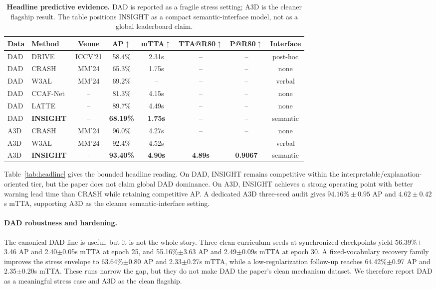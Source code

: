 \documentclass[11pt]{article}
\newcommand{\method}{\textsc{INSIGHT}}
\begin{document}
\begin{table}[t]
\centering\small
\setlength{\tabcolsep}{4pt}
\caption{\textbf{Headline predictive evidence.} DAD is reported as a fragile
stress setting; A3D is the cleaner flagship result. The table positions
\method{} as a compact semantic-interface model, not as a global leaderboard
claim.}
\label{tab:headline}
\label{tab:dad}
\label{tab:a3d}
\begin{tabular}{llcccccc}
\toprule
Data & Method & Venue & AP$\uparrow$ & mTTA$\uparrow$ & TTA@R80$\uparrow$ & P@R80$\uparrow$ & Interface \\
\midrule
DAD & DRIVE~\citep{ref2} & ICCV'21 & 58.4\% & 2.31s & -- & -- & post-hoc \\
DAD & CRASH~\citep{liao2024crash} & MM'24 & 65.3\% & 1.75s & -- & -- & none \\
DAD & W3AL~\citep{liao2024and} & MM'24 & 69.2\% & -- & -- & -- & verbal \\
DAD & CCAF-Net~\citep{liu2025ccaf} & -- & 81.3\% & 4.15s & -- & -- & none \\
DAD & LATTE~\citep{ZHANG2025103173} & -- & 89.7\% & 4.49s & -- & -- & none \\
DAD & \textbf{\method{}} & -- & \textbf{68.19\%} & \textbf{1.75s} & -- & -- & semantic \\
\midrule
A3D & CRASH~\citep{liao2024crash} & MM'24 & 96.0\% & 4.27s & -- & -- & none \\
A3D & W3AL~\citep{liao2024and} & MM'24 & 92.4\% & 4.52s & -- & -- & verbal \\
A3D & \textbf{\method{}} & -- & \textbf{93.40\%} & \textbf{4.90s} & \textbf{4.89s} & \textbf{0.9067} & semantic \\
\bottomrule
\end{tabular}
\end{table}

Table~\ref{tab:headline} gives the bounded headline reading. On DAD,
\method{} remains competitive within the interpretable/explanation-oriented
tier, but the paper does not claim global DAD dominance. On A3D, \method{}
achieves a strong operating point with better warning lead time than CRASH while
retaining competitive AP. A dedicated A3D three-seed audit gives
$94.16\%\pm0.95$ AP and $4.62\pm0.42$s mTTA, supporting A3D as the cleaner
semantic-interface setting.

\paragraph{DAD robustness and hardening.}
The canonical DAD line is useful, but it is not the whole story. Three clean
curriculum seeds at synchronized checkpoints yield 56.39\%$\pm$3.46 AP and
2.40$\pm$0.05s mTTA at epoch 25, and 55.16\%$\pm$3.63 AP and
2.49$\pm$0.09s mTTA at epoch 30. A fixed-vocabulary recovery family improves
the stress envelope to 63.64\%$\pm$0.80 AP and 2.33$\pm$0.27s mTTA, while a
low-regularization follow-up reaches 64.42\%$\pm$0.97 AP and
2.35$\pm$0.20s mTTA. These runs narrow the gap, but they do not make DAD the
paper's clean mechanism dataset. We therefore report DAD as a meaningful stress
case and A3D as the clean flagship.
\end{document}
